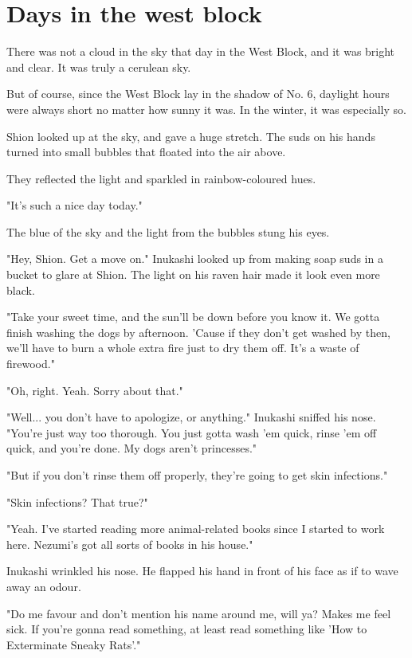 
\chapter{Days in the west block}

There was not a cloud in the sky that day in the West Block, and it was
bright and clear. It was truly a cerulean sky.

But of course, since the West Block lay in the shadow of No. 6, daylight
hours were always short no matter how sunny it was. In the winter, it
was especially so.

Shion looked up at the sky, and gave a huge stretch. The suds on his
hands turned into small bubbles that floated into the air above.

They reflected the light and sparkled in rainbow-coloured hues.

"It's such a nice day today."

The blue of the sky and the light from the bubbles stung his eyes.

"Hey, Shion. Get a move on." Inukashi looked up from making soap suds in
a bucket to glare at Shion. The light on his raven hair made it look
even more black.

"Take your sweet time, and the sun'll be down before you know it. We
gotta finish washing the dogs by afternoon. 'Cause if they don't get
washed by then, we'll have to burn a whole extra fire just to dry them
off. It's a waste of firewood."

"Oh, right. Yeah. Sorry about that."

"Well... you don't have to apologize, or anything." Inukashi sniffed his
nose. "You're just way too thorough. You just gotta wash 'em quick,
rinse 'em off quick, and you're done. My dogs aren't princesses."

"But if you don't rinse them off properly, they're going to get skin
infections."

"Skin infections? That true?"

"Yeah. I've started reading more animal-related books since I started to
work here. Nezumi's got all sorts of books in his house."

Inukashi wrinkled his nose. He flapped his hand in front of his face as
if to wave away an odour.

"Do me favour and don't mention his name around me, will ya? Makes me
feel sick. If you're gonna read something, at least read something like
'How to Exterminate Sneaky Rats'."

